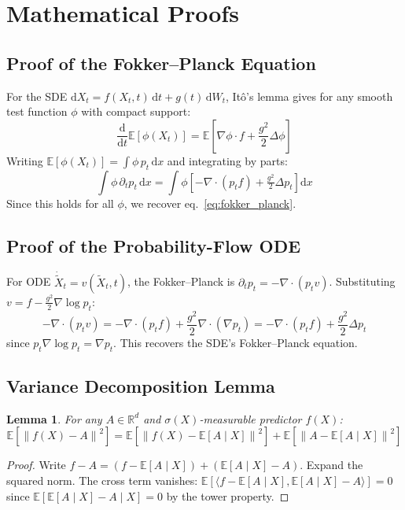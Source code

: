 \documentclass[11pt, a4paper]{article}
\newcommand{\Rd}{\mathbb{R}}
\newcommand{\E}{\mathbb{E}}
\newcommand{\dd}{\mathrm{d}}
\newcommand{\grad}{\nabla}
\newcommand{\divg}{\nabla \cdot}
\newcommand{\norm}[1]{\left\|#1\right\|}
\theoremstyle{plain}
\newtheorem{lemma}[theorem]{Lemma}
\theoremstyle{definition}
\theoremstyle{remark}
\begin{document}
\appendix

\section{Mathematical Proofs}

\subsection{Proof of the Fokker--Planck Equation}

For the SDE $\dd X_t = f(X_t,t)\,\dd t + g(t)\,\dd W_t$, It\^{o}'s lemma gives for any smooth test function $\phi$ with compact support:
\[
  \frac{\dd}{\dd t}\E[\phi(X_t)] = \E\!\left[\grad \phi \cdot f + \frac{g^2}{2}\Delta \phi\right]
\]
Writing $\E[\phi(X_t)] = \int \phi\, p_t\,\dd x$ and integrating by parts:
\[
  \int \phi\,\partial_t p_t\,\dd x = \int \phi\!\left[-\divg(p_t f) + \tfrac{g^2}{2}\Delta p_t\right]\dd x
\]
Since this holds for all $\phi$, we recover eq.~\eqref{eq:fokker_planck}.

\subsection{Proof of the Probability-Flow ODE}

For ODE $\dot{\tilde{X}}_t = v(\tilde{X}_t,t)$, the Fokker--Planck is $\partial_t p_t = -\divg(p_t v)$. Substituting $v = f - \frac{g^2}{2}\grad \log p_t$:
\[
  -\divg(p_t v) = -\divg(p_t f) + \frac{g^2}{2}\divg(\grad p_t) = -\divg(p_t f) + \frac{g^2}{2}\Delta p_t
\]
since $p_t \grad \log p_t = \grad p_t$. This recovers the SDE's Fokker--Planck equation.

\subsection{Variance Decomposition Lemma}

\begin{lemma}
For any $A \in \Rd^d$ and $\sigma(X)$-measurable predictor $f(X)$:
\[
  \E[\norm{f(X)-A}^2] = \E[\norm{f(X)-\E[A\mid X]}^2] + \E[\norm{A-\E[A\mid X]}^2]
\]
\end{lemma}
\begin{proof}
Write $f-A = (f-\E[A\mid X]) + (\E[A\mid X]-A)$. Expand the squared norm. The cross term vanishes: $\E[\langle f-\E[A\mid X], \E[A\mid X]-A\rangle] = 0$ since $\E[\E[A\mid X]-A \mid X] = 0$ by the tower property.
\end{proof}
\end{document}
